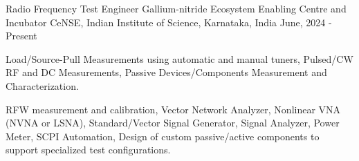 

\begin{cventries}

  \cventry
    {Radio Frequency Test Engineer} %
    {Gallium-nitride Ecosystem Enabling Centre and Incubator} %
    {CeNSE, Indian Institute of Science, Karnataka, India} %
    {June, 2024 - Present} %
    {
      \begin{cvitems} %
        \item {Load/Source-Pull Measurements using automatic and manual tuners, Pulsed/CW RF and DC Measurements, Passive Devices/Components Measurement and Characterization.}
        \item { RF{\textmu}W measurement and calibration, Vector Network Analyzer, Nonlinear VNA (NVNA or LSNA), Standard/Vector Signal Generator, Signal Analyzer, Power Meter, SCPI Automation, Design of custom passive/active components to support specialized test configurations.}
      \end{cvitems}
    }

\end{cventries}